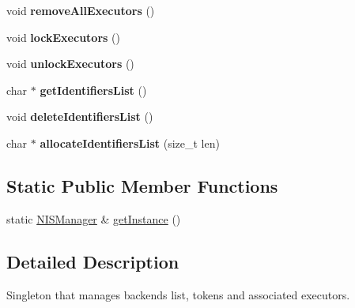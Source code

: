 \begin{DoxyCompactItemize}
\item 
\hypertarget{classNISManager_a19037ce4d2614109b7086abdab6fad95}{void {\bfseries remove\-All\-Executors} ()}\label{classNISManager_a19037ce4d2614109b7086abdab6fad95}

\item 
\hypertarget{classNISManager_a4aeb245433ea7ac918528db687b618cc}{void {\bfseries lock\-Executors} ()}\label{classNISManager_a4aeb245433ea7ac918528db687b618cc}

\item 
\hypertarget{classNISManager_a9b4f1f7c0dcc5d834913e8534097c47a}{void {\bfseries unlock\-Executors} ()}\label{classNISManager_a9b4f1f7c0dcc5d834913e8534097c47a}

\item 
\hypertarget{classNISManager_a713e9399922ebfdb0b5bbe5fee8f1bc3}{char $\ast$ {\bfseries get\-Identifiers\-List} ()}\label{classNISManager_a713e9399922ebfdb0b5bbe5fee8f1bc3}

\item 
\hypertarget{classNISManager_a56879726595d8357c09ecafe5cb074e3}{void {\bfseries delete\-Identifiers\-List} ()}\label{classNISManager_a56879726595d8357c09ecafe5cb074e3}

\item 
\hypertarget{classNISManager_ab55cd1e722e46885664f52eb883e2ead}{char $\ast$ {\bfseries allocate\-Identifiers\-List} (size\-\_\-t len)}\label{classNISManager_ab55cd1e722e46885664f52eb883e2ead}

\end{DoxyCompactItemize}
\subsection*{Static Public Member Functions}
\begin{DoxyCompactItemize}
\item 
static \hyperlink{classNISManager}{N\-I\-S\-Manager} \& \hyperlink{classNISManager_af6a7f2cb644fe38ef43b2ed9323506c7}{get\-Instance} ()
\end{DoxyCompactItemize}


\subsection{Detailed Description}
Singleton that manages backends list, tokens and associated executors. 

